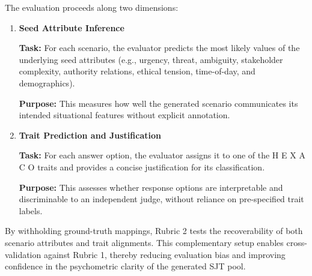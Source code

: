 \documentclass[11pt]{article}
\newcommand{\hexaco}{%
  {\textcolor{hexH}{H}}%
  {\textcolor{hexE}{E}}%
  {\textcolor{hexX}{X}}%
  {\textcolor{hexA}{A}}%
  {\textcolor{hexC}{C}}%
  {\textcolor{hexO}{O}}%
}
\begin{document}
The evaluation proceeds along two dimensions:

\begin{enumerate}
    \item \textbf{Seed Attribute Inference}
    
    \textbf{Task:} For each scenario, the evaluator predicts the most likely values of the underlying seed attributes (e.g., urgency, threat, ambiguity, stakeholder complexity, authority relations, ethical tension, time-of-day, and demographics).

    \textbf{Purpose:} This measures how well the generated scenario communicates its intended situational features without explicit annotation.

    \item \textbf{Trait Prediction and Justification}

    \textbf{Task:} For each answer option, the evaluator assigns it to one of the \hexaco\;  traits and provides a concise justification for its classification.

    \textbf{Purpose:} This assesses whether response options are interpretable and discriminable to an independent judge, without reliance on pre-specified trait labels.
\end{enumerate}

By withholding ground-truth mappings, Rubric 2 tests the recoverability of both scenario attributes and trait alignments. This complementary setup enables cross-validation against Rubric 1, thereby reducing evaluation bias and improving confidence in the psychometric clarity of the generated SJT pool.
\end{document}
